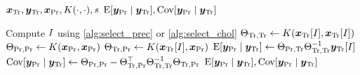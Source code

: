 \begin{algorithmic}[1]
  \REQUIRE \(
    \bm{x}_{\text{Tr}}, \bm{y}_{\text{Tr}},
    \bm{x}_{\text{Pr}}, K(\cdot, \cdot), s
  \)
  \ENSURE \(
      \operatorname{E}[\bm{y}_{\text{Pr}} \mid \bm{y}_{\text{Tr}}],
    \operatorname{Cov}[\bm{y}_{\text{Pr}} \mid \bm{y}_{\text{Tr}}]
  \)

  \STATE Compute \( I \) using \cref{alg:select_prec} or \cref{alg:select_chol}
  \STATE \(
    \Theta_{\text{Tr}, \text{Tr}} \gets
    K(\bm{x}_{\text{Tr}}[I], \bm{x}_{\text{Tr}}[I])
  \)
  \STATE \(
    \Theta_{\text{Pr}, \text{Pr}} \gets
    K(\bm{x}_{\text{Pr}}, \bm{x}_{\text{Pr}})
  \)
  \STATE \(
    \Theta_{\text{Tr}, \text{Pr}} \gets
    K(\bm{x}_{\text{Tr}}[I], \bm{x}_{\text{Pr}})
  \)
  \STATE \(
    \operatorname{E}[\bm{y}_{\text{Pr}} \mid \bm{y}_{\text{Tr}}] \gets
    \Theta_{\text{Pr}, \text{Tr}} \Theta_{\text{Tr}, \text{Tr}}^{-1}
    \bm{y}_{\text{Tr}}[I]
  \)
  \STATE \(
    \operatorname{Cov}[\bm{y}_{\text{Pr}} \mid \bm{y}_{\text{Tr}}] \gets
    \Theta_{\text{Pr}, \text{Pr}} -
    \Theta_{\text{Tr}, \text{Pr}}^{\top} \Theta_{\text{Tr}, \text{Tr}}^{-1}
    \Theta_{\text{Tr}, \text{Pr}}
  \)
  \RETURN \(
      \operatorname{E}[\bm{y}_{\text{Pr}} \mid \bm{y}_{\text{Tr}}],
    \operatorname{Cov}[\bm{y}_{\text{Pr}} \mid \bm{y}_{\text{Tr}}]
  \)
\end{algorithmic}
